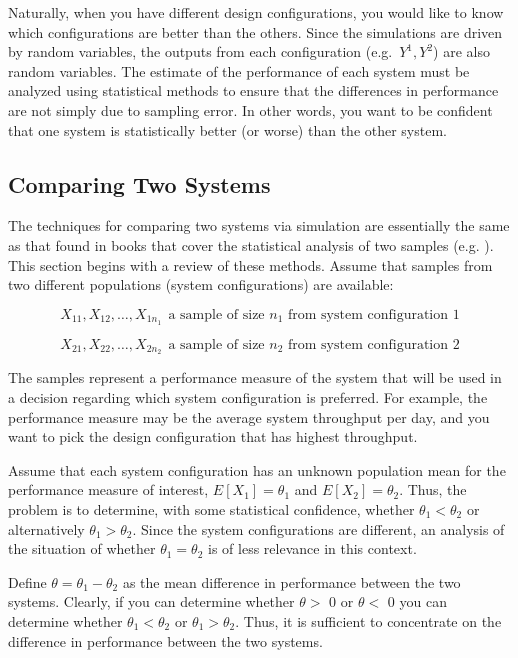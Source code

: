 \documentclass[
]{book}
\theoremstyle{definition}
\theoremstyle{definition}
\theoremstyle{definition}
\theoremstyle{definition}
\theoremstyle{remark}
\begin{document}
Naturally, when you have different design configurations, you would like
to know which configurations are better than the others. Since the
simulations are driven by random variables, the outputs from each
configuration (e.g.~\(Y^1, Y^2\)) are also random variables. The estimate
of the performance of each system must be analyzed using statistical
methods to ensure that the differences in performance are not simply due
to sampling error. In other words, you want to be confident that one
system is statistically better (or worse) than the other system.

\hypertarget{simoa:comparingSystems:two}{%
\subsection{Comparing Two Systems}\label{simoa:comparingSystems:two}}

The techniques for comparing two systems via simulation are essentially
the same as that found in books that cover the statistical analysis of
two samples (e.g. \citep{montgomery2006applied}). This section begins with a
review of these methods. Assume that samples from two different
populations (system configurations) are available:

\[X_{11}, X_{12},\ldots, X_{1 n_1} \ \ \text{a sample of size $n_1$ from system configuration 1}\]

\[X_{21}, X_{22},\ldots, X_{2 n_2} \ \ \text{a sample of size $n_2$ from system configuration 2}\]

The samples represent a performance measure of the system that will be
used in a decision regarding which system configuration is preferred.
For example, the performance measure may be the average system
throughput per day, and you want to pick the design configuration that
has highest throughput.

Assume that each system configuration has an unknown population mean for
the performance measure of interest, \(E[X_1] = \theta_1\) and
\(E[X_2] = \theta_2\). Thus, the problem is to determine, with some
statistical confidence, whether \(\theta_1 < \theta_2\) or alternatively
\(\theta_1 > \theta_2\). Since the system configurations are different, an
analysis of the situation of whether \(\theta_1 = \theta_2\) is of less
relevance in this context.

Define \(\theta = \theta_1 - \theta_2\) as the mean difference in
performance between the two systems. Clearly, if you can determine
whether \(\theta >\) 0 or \(\theta <\) 0 you can determine whether
\(\theta_1 < \theta_2\) or \(\theta_1 > \theta_2\). Thus, it is sufficient
to concentrate on the difference in performance between the two systems.
\end{document}
